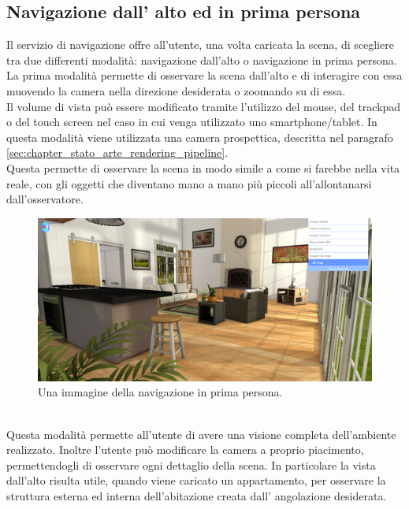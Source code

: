 \subsection{Navigazione dall' alto ed in prima persona}
\label{sec:chapter_navigazione_scena_caratt_navigat_navig_alto}
Il servizio di navigazione offre all’utente, una volta caricata la scena, di scegliere tra due differenti modalità: navigazione dall’alto o navigazione in prima persona.
\\
La prima modalità permette di osservare la scena dall’alto e di interagire con essa muovendo la camera nella direzione desiderata o zoomando su di essa. 
\\
Il volume di vista può essere modificato tramite l’utilizzo del mouse, del trackpad o del touch screen nel caso in cui venga utilizzato uno smartphone/tablet.
In questa modalità viene utilizzata una camera prospettica, descritta nel paragrafo \ref{sec:chapter_stato_arte_rendering_pipeline}. 
\\
Questa permette di osservare la scena in modo simile a come si farebbe nella vita reale, con gli oggetti che diventano mano a mano più piccoli all’allontanarsi dall’osservatore.
\\
\begin{figure}[htb]
 \centering
 \includegraphics[width=1\linewidth]{images/chapter_navigazione_scena/navigator_persp.png}\hfill
 \caption[Navigazione in prima persona]{Una immagine della navigazione in prima persona.}
 \label{fig:navigazione_scena_navigator_persp}
\end{figure}
\\
Questa modalità permette all’utente di avere una visione completa dell’ambiente realizzato. Inoltre l’utente può modificare la camera a proprio piacimento, permettendogli di osservare ogni dettaglio della scena.
In particolare la vista dall’alto risulta utile, quando viene caricato un appartamento, per osservare la struttura esterna ed interna dell’abitazione creata dall’ angolazione desiderata.
